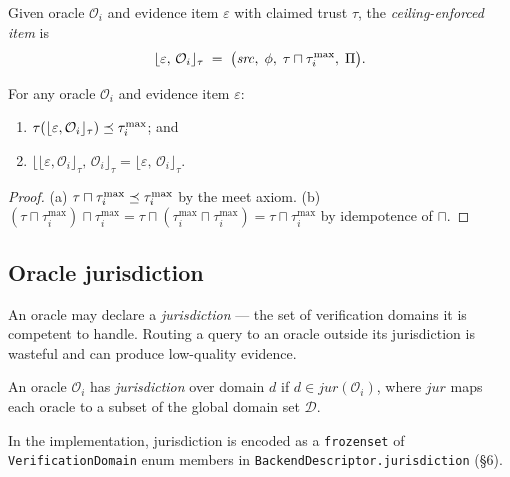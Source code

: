\documentclass[11pt]{article}
\newcommand{\Oracle}{\mathcal{O}}            %
\newcommand{\Orcl}[1]{\Oracle_{#1}}         %
\newcommand{\tlev}[1]{\tau(#1)}              %
\newcommand{\tmin}{\sqcap}                   %
\newcommand{\Ceil}[1]{\lfloor #1 \rfloor_{\tau}}   %
\newcommand{\EvidItem}{\varepsilon}          %
\begin{document}
\begin{definition}\label{def:ceil-enforce}
  Given oracle $\Orcl{i}$ and evidence item $\EvidItem$ with claimed
  trust $\tau$, the \emph{ceiling-enforced item} is
  \[
    \Ceil{\EvidItem,\, \Orcl{i}} \;=\;
    \bigl(\mathit{src},\;\phi,\;\tau \tmin \tau_i^{\max},\;\prov\bigr).
  \]
\end{definition}

\begin{proposition}
  \label{prop:ceil-idempotent}
  For any oracle $\Orcl{i}$ and evidence item $\EvidItem$:
  \begin{enumerate}[label=(\alph*),nosep]
    \item $\tlev{\Ceil{\EvidItem, \Orcl{i}}} \tleq \tau_i^{\max}$; and
    \item $\Ceil{\Ceil{\EvidItem, \Orcl{i}},\, \Orcl{i}}
           = \Ceil{\EvidItem,\, \Orcl{i}}$.
  \end{enumerate}
\end{proposition}
\begin{proof}
  (a) $\tau \tmin \tau_i^{\max} \tleq \tau_i^{\max}$ by the meet axiom.
  (b) $(\tau \tmin \tau_i^{\max}) \tmin \tau_i^{\max}
       = \tau \tmin (\tau_i^{\max} \tmin \tau_i^{\max})
       = \tau \tmin \tau_i^{\max}$ by idempotence of $\tmin$.
\end{proof}

\subsection{Oracle jurisdiction}

An oracle may declare a \emph{jurisdiction} — the set of verification
domains it is competent to handle.  Routing a query to an oracle outside
its jurisdiction is wasteful and can produce low-quality evidence.

\begin{definition}[Jurisdiction]\label{def:jurisdiction}
  An oracle $\Orcl{i}$ has \emph{jurisdiction} over domain $d$ if
  $d \in \mathit{jur}(\Orcl{i})$, where $\mathit{jur}$ maps each oracle
  to a subset of the global domain set $\mathcal{D}$.
\end{definition}

In the implementation, jurisdiction is encoded as a \texttt{frozenset}
of \texttt{VerificationDomain} enum members in
\texttt{BackendDescriptor.jurisdiction} (§6).

\end{document}
